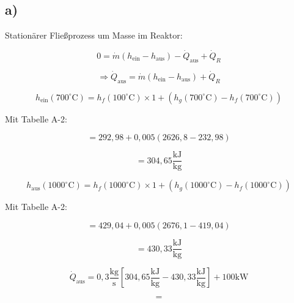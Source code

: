 

\subsection*{a)}
Stationärer Fließprozess um Masse im Reaktor:

\[
0 = \dot{m} (h_{\text{ein}} - h_{\text{aus}}) - \dot{Q}_{\text{aus}} + \dot{Q}_R
\]

\[
\Rightarrow \dot{Q}_{\text{aus}} = \dot{m} (h_{\text{ein}} - h_{\text{aus}}) + \dot{Q}_R
\]

\[
h_{\text{ein}} (700^\circ \text{C}) = h_f (100^\circ \text{C}) \times 1 + (h_g (700^\circ \text{C}) - h_f (700^\circ \text{C}))
\]

Mit Tabelle A-2:

\[
= 292,98 + 0,005 (2626,8 - 232,98)
\]

\[
= 304,65 \frac{\text{kJ}}{\text{kg}}
\]

\[
h_{\text{aus}} (1000^\circ \text{C}) = h_f (1000^\circ \text{C}) \times 1 + (h_g (1000^\circ \text{C}) - h_f (1000^\circ \text{C}))
\]

Mit Tabelle A-2:

\[
= 429,04 + 0,005 (2676,1 - 419,04)
\]

\[
= 430,33 \frac{\text{kJ}}{\text{kg}}
\]

\[
\dot{Q}_{\text{aus}} = 0,3 \frac{\text{kg}}{\text{s}} \left[ 304,65 \frac{\text{kJ}}{\text{kg}} - 430,33 \frac{\text{kJ}}{\text{kg}} \right] + 100 \text{kW}
\]

\[
=
\]